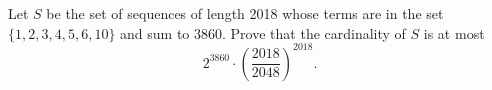 Let $S$ be the set of sequences of length 2018 whose terms are in the set $\{1, 2, 3, 4, 5, 6, 10\}$ and sum to 3860. Prove that the cardinality of $S$ is at most
\[2^{3860} \cdot \left(\frac{2018}{2048}\right)^{2018}.\]